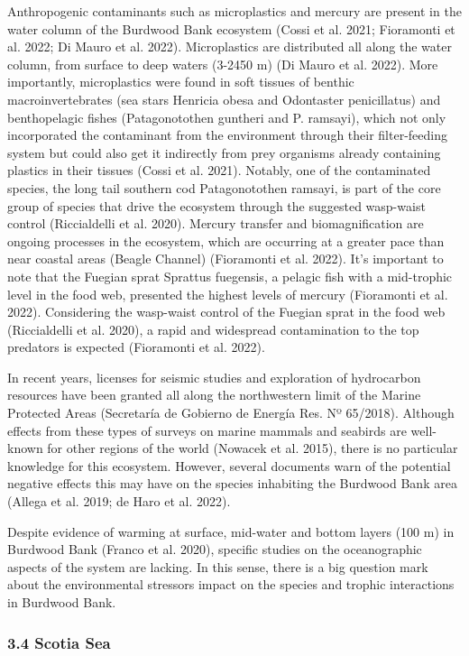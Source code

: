 \documentclass[
]{article}
\begin{document}
Anthropogenic contaminants such as microplastics and mercury are present
in the water column of the Burdwood Bank ecosystem (Cossi et al. 2021;
Fioramonti et al. 2022; Di Mauro et al. 2022). Microplastics are
distributed all along the water column, from surface to deep waters
(3-2450 m) (Di Mauro et al. 2022). More importantly, microplastics were
found in soft tissues of benthic macroinvertebrates (sea stars Henricia
obesa and Odontaster penicillatus) and benthopelagic fishes
(Patagonotothen guntheri and P. ramsayi), which not only incorporated
the contaminant from the environment through their filter-feeding system
but could also get it indirectly from prey organisms already containing
plastics in their tissues (Cossi et al. 2021). Notably, one of the
contaminated species, the long tail southern cod Patagonotothen ramsayi,
is part of the core group of species that drive the ecosystem through
the suggested wasp-waist control (Riccialdelli et al. 2020). Mercury
transfer and biomagnification are ongoing processes in the ecosystem,
which are occurring at a greater pace than near coastal areas (Beagle
Channel) (Fioramonti et al. 2022). It's important to note that the
Fuegian sprat Sprattus fuegensis, a pelagic fish with a mid-trophic
level in the food web, presented the highest levels of mercury
(Fioramonti et al. 2022). Considering the wasp-waist control of the
Fuegian sprat in the food web (Riccialdelli et al. 2020), a rapid and
widespread contamination to the top predators is expected (Fioramonti et
al. 2022).

In recent years, licenses for seismic studies and exploration of
hydrocarbon resources have been granted all along the northwestern limit
of the Marine Protected Areas (Secretaría de Gobierno de Energía Res. Nº
65/2018). Although effects from these types of surveys on marine mammals
and seabirds are well-known for other regions of the world (Nowacek et
al. 2015), there is no particular knowledge for this ecosystem. However,
several documents warn of the potential negative effects this may have
on the species inhabiting the Burdwood Bank area (Allega et al. 2019; de
Haro et al. 2022).

Despite evidence of warming at surface, mid-water and bottom layers (100
m) in Burdwood Bank (Franco et al. 2020), specific studies on the
oceanographic aspects of the system are lacking. In this sense, there is
a big question mark about the environmental stressors impact on the
species and trophic interactions in Burdwood Bank.

\subsubsection{3.4 Scotia Sea}\label{scotia-sea}
\end{document}
